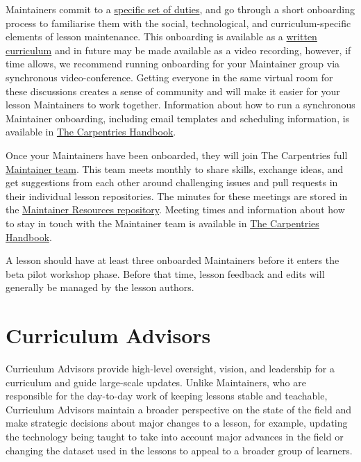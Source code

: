 \documentclass[
]{book}
\begin{document}
Maintainers commit to a \href{https://docs.carpentries.org/topic_folders/maintainers/maintainers.html\#maintainer-guidelines}{specific set of duties}, and
go through a short onboarding process to familiarise them with the social,
technological, and curriculum-specific elements of lesson maintenance.
This onboarding is available as a \href{https://carpentries.github.io/maintainer-onboarding/}{written curriculum}
and in future may be made available as a video recording, however, if
time allows, we recommend running onboarding for your Maintainer group via
synchronous video-conference. Getting everyone in the same virtual room for
these discussions creates a sense of community and will make it easier for
your lesson Maintainers to work together. Information about how to run
a synchronous Maintainer onboarding, including email templates and
scheduling information, is available in \href{https://docs.carpentries.org/topic_folders/maintainers/maintainers.html\#maintainer-onboarding}{The Carpentries Handbook}.

Once your Maintainers have been onboarded, they will join The Carpentries
full \href{https://carpentries.org/maintainers/}{Maintainer team}. This team meets monthly to share
skills, exchange ideas, and get suggestions from each other around
challenging issues and pull requests in their individual lesson repositories.
The minutes for these meetings are stored in the \href{https://github.com/carpentries/maintainer-resources}{Maintainer Resources repository}.
Meeting times and information about how to stay in touch with the Maintainer
team is available in \href{https://docs.carpentries.org/topic_folders/maintainers/maintainers.html\#how-to-stay-in-touch}{The Carpentries Handbook}.

A lesson should have at least three onboarded Maintainers before it enters the
beta pilot workshop phase. Before that time, lesson feedback and edits will generally be
managed by the lesson authors.

\hypertarget{curriculum-advisors}{%
\section{Curriculum Advisors}\label{curriculum-advisors}}

Curriculum Advisors provide high-level oversight, vision, and leadership for a
curriculum and guide large-scale updates. Unlike Maintainers, who are responsible
for the day-to-day work of keeping lessons stable and teachable, Curriculum
Advisors maintain a broader perspective on the state of the field and make
strategic decisions about major changes to a lesson, for example, updating the
technology being taught to take into account major advances in the field or
changing the dataset used in the lessons to appeal to a broader group of learners.
\end{document}
